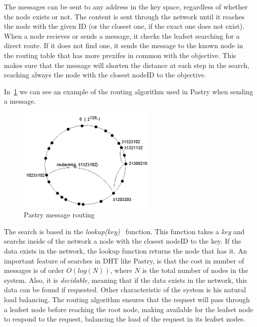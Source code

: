 The messages can be sent to any address in the key space, regardless of whether
the node exists or not. The content is sent through the network until it reaches the node with the given ID (or the closest one, if the exact one does not exist). When a node recieves or sends a message, it checks the leafset searching for a direct route. If it does not find one, it sends the message to the known node in the routing table that has  more prexifes in common with the objective. This makes sure that the message will shorten the distance at each step in the search, reaching always the node with the closest nodeID to the objective.

In~\ref{fig:p2p_pastry_routing} we can see an example of the routing algorithm used in Pastry when sending a message.

\begin{figure}
\center
\includegraphics[width=0.6\textwidth]{img/pastryrouting}
\caption{Pastry message routing}
\label{fig:p2p_pastry_routing}
\end{figure}


The search is based in the \textit{lookup(key)}~\cite{BalakrishnanEtAl03} function.
This function takes a \textit{key} and searchs inside of the network a node with
the closest nodeID to the key. If the data exists in the network, the lookup
function returns the node that has it. An important feature of searches in DHT
like Pastry, is that the cost in number of messages is of order $O(log(N))$,
where $N$ is the total number of nodes in the system. Also, it is
\textit{decidable}, meaning that if the data exists in the network, this data
can be found if requested. Other characteristic of the system is his natural
load balancing. The routing algorithm ensures that the request will pass through
a leafset node before reaching the root node, making available for the leafset
node to respond to the request, balancing the load of the request in its
leafset nodes.


